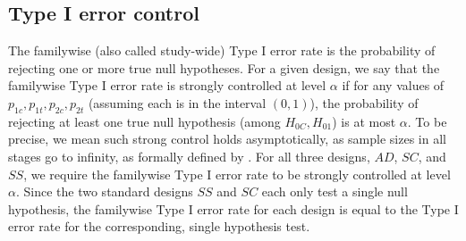 \documentclass[article]{jss}
\newcommand{\htx}[2]{\hspace{ #1 cm} \text{ #2 } }
\begin{document}

\subsection{Type I error control}
\label{sub:typeIerror}



The familywise (also called study-wide) Type I error rate is the probability of rejecting one or more true null hypotheses.
For a given design, we say that the familywise Type I error rate is strongly controlled at level $α$ if 
for any values of  $p_{1c},p_{1t},p_{2c},p_{2t}$ (assuming each is in the interval $(0,1)$), 
the probability of rejecting at least one true null hypothesis (among $H_{0C}, H_{01}$) is at most $α$. To be precise, we mean such strong control holds asymptotically, as sample sizes in all stages go to infinity, as formally defined by \cite{Rosenblum2013AdaptMISTIE}. %
For all three designs, $AD$, $SC$, and $SS$, we require the familywise Type I error rate to be strongly controlled at level $α$. 
Since the two standard designs $SS$ and $SC$ each only test a single null hypothesis, the familywise Type I error rate for each design is equal to the  Type I error rate for the corresponding, single hypothesis test.
\end{document}
